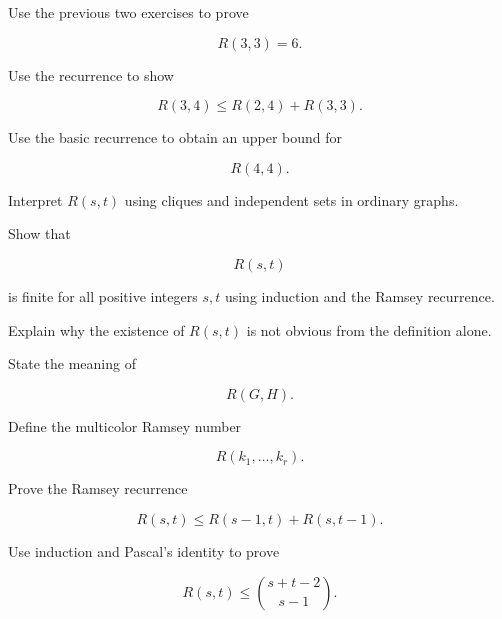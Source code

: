 \begin{exercise}[2]
Use the previous two exercises to prove

\[
R(3,3)=6.
\]
\end{exercise}

\begin{exercise}[2]
Use the recurrence to show

\[
R(3,4)
\leq
R(2,4)+R(3,3).
\]
\end{exercise}

\begin{exercise}[2]
Use the basic recurrence to obtain an upper bound for

\[
R(4,4).
\]
\end{exercise}

\begin{exercise}[2]
Interpret \(R(s,t)\) using cliques and independent sets in ordinary
graphs.
\end{exercise}

\begin{exercise}[2]
Show that

\[
R(s,t)
\]

is finite for all positive integers \(s,t\) using induction and the
Ramsey recurrence.
\end{exercise}

\begin{exercise}[2]
Explain why the existence of \(R(s,t)\) is not obvious from the
definition alone.
\end{exercise}

\begin{exercise}[2]
State the meaning of

\[
R(G,H).
\]
\end{exercise}

\begin{exercise}[2]
Define the multicolor Ramsey number

\[
R(k_1,\ldots,k_r).
\]
\end{exercise}

\begin{exercise}[3]
Prove the Ramsey recurrence

\[
R(s,t)
\leq
R(s-1,t)+R(s,t-1).
\]
\end{exercise}

\begin{exercise}[3]
Use induction and Pascal's identity to prove

\[
R(s,t)
\leq
\binom{s+t-2}{s-1}.
\]
\end{exercise}

